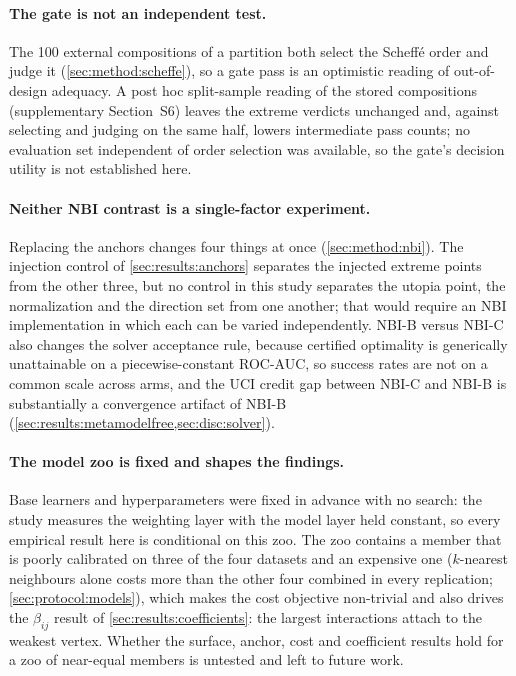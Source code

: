 \paragraph{The gate is not an independent test.} The 100 external compositions of a partition both select the
Scheff\'e order and judge it (\cref{sec:method:scheffe}), so a gate pass is an optimistic reading of out-of-design
adequacy. A post hoc split-sample reading of the stored compositions (supplementary Section~S6) leaves the extreme
verdicts unchanged and, against selecting and judging on the same half, lowers intermediate pass counts; no evaluation set independent of order selection was
available, so the gate's decision utility is not established here.

\paragraph{Neither NBI contrast is a single-factor experiment.} Replacing the anchors changes four things at once
(\cref{sec:method:nbi}). The injection control of \cref{sec:results:anchors} separates the injected extreme points from
the other three, but no control in this study separates the utopia point, the normalization and the direction set from
one another; that would require an NBI implementation in which each can be varied independently. NBI-B versus NBI-C
also changes the solver acceptance rule, because certified optimality is generically unattainable on a
piecewise-constant ROC-AUC, so success rates are not on a common scale across arms, and the UCI credit gap between
NBI-C and NBI-B is substantially a convergence artifact of NBI-B (\cref{sec:results:metamodelfree,sec:disc:solver}).

\paragraph{The model zoo is fixed and shapes the findings.} Base learners and hyperparameters were fixed in advance
with no search: the study measures the weighting layer with the model layer held constant, so every empirical result
here is conditional on this zoo. The zoo contains a member that is poorly calibrated on three of the four datasets and
an expensive one ($k$-nearest neighbours alone costs more than the other four combined in every replication;
\cref{sec:protocol:models}), which makes the cost objective non-trivial and also drives the $\beta_{ij}$ result of
\cref{sec:results:coefficients}: the largest interactions attach to the weakest vertex. Whether the surface, anchor,
cost and coefficient results hold for a zoo of near-equal members is untested and left to future work.

